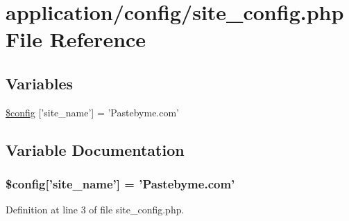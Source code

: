 \hypertarget{site__config_8php}{\section{application/config/site\-\_\-config.php File Reference}
\label{site__config_8php}
}
\subsection*{Variables}
\begin{DoxyCompactItemize}
\item 
\hyperlink{site__config_8php_aec04da994bcb63f1303d192f60e2f666}{\$config} \mbox{[}'site\-\_\-name'\mbox{]} = 'Pastebyme.\-com'
\end{DoxyCompactItemize}


\subsection{Variable Documentation}
\hypertarget{site__config_8php_aec04da994bcb63f1303d192f60e2f666}{
\subsubsection[{\$config}]{\setlength{\rightskip}{0pt plus 5cm}\$config\mbox{[}'site\-\_\-name'\mbox{]} = 'Pastebyme.\-com'}}\label{site__config_8php_aec04da994bcb63f1303d192f60e2f666}


Definition at line 3 of file site\-\_\-config.\-php.

